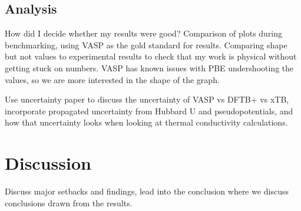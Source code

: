 \subsection{Analysis}

How did I decide whether my results were good? Comparison of plots during benchmarking, using VASP as the gold standard for results. Comparing shape but not values to experimental results to check that my work is physical without getting stuck on numbers. VASP has known issues with PBE undershooting the values, so we are more interested in the shape of the graph.

Use uncertainty paper to discuss the uncertainty of VASP vs DFTB+ vs xTB, incorporate propagated uncertainty from Hubbard U and pseudopotentials, and how that uncertainty looks when looking at thermal conductivity calculations.

\section{Discussion}

Discuss major setbacks and findings, lead into the conclusion where we discuss conclusions drawn from the results.

\clearpage